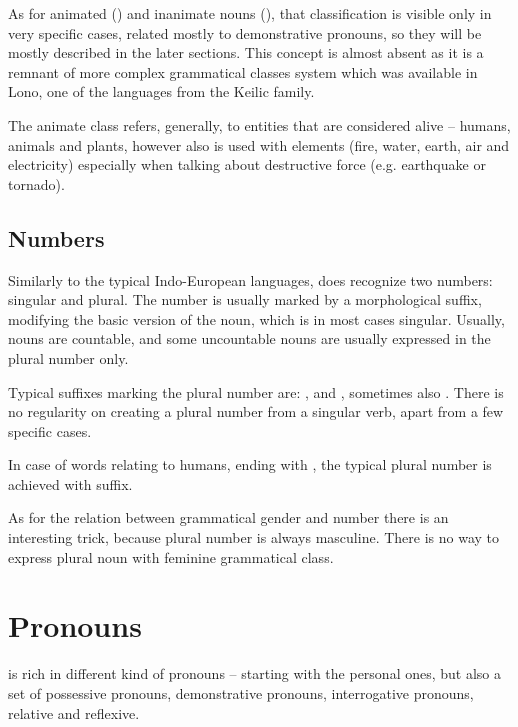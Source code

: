 As for animated (\An{}) and inanimate nouns (\Inan{}), that classification is
visible only in very specific cases, related mostly to demonstrative pronouns,
so they will be mostly described in the later sections. This concept is almost
absent as it is a remnant of more complex grammatical classes system which was
available in Lono, one of the languages from the Keilic family.

The animate class refers, generally, to entities that are considered alive --
humans, animals and plants, however also is used with elements (fire, water,
earth, air and electricity) especially when talking about destructive force
(e.g. earthquake or tornado).

\subsection{Numbers}

Similarly to the typical Indo-European languages, \andro does recognize two
numbers: singular and plural. The number is usually marked by a morphological
suffix, modifying the basic version of the noun, which is in most cases
singular. Usually, nouns are countable, and some uncountable nouns are usually
expressed in the plural number only.


Typical suffixes marking the plural number are: ,  and ,
sometimes also . There is no regularity on creating a plural number from
a singular verb, apart from a few specific cases.

In case of words relating to humans, ending with , the typical plural
number is achieved with  suffix.

As for the relation between grammatical gender and number there is an
interesting trick, because plural number is always masculine. There is no way to
express plural noun with feminine grammatical class.

\section{Pronouns}
\label{sec:morph-pronouns}

\andro is rich in different kind of pronouns -- starting with the personal ones,
but also a set of possessive pronouns, demonstrative pronouns, interrogative
pronouns, relative and reflexive.

